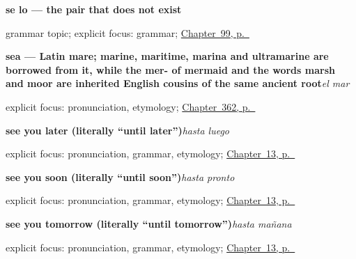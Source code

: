 \noindent\begin{minipage}[t]{\linewidth}
\raggedright
\textbf{se lo — the pair that does not exist}\par
\footnotesize grammar topic; explicit focus: grammar; \hyperref[ch:se-for-le]{Chapter~99, p.~\pageref*{ch:se-for-le}}
\end{minipage}\par\smallskip

\noindent\begin{minipage}[t]{\linewidth}
\raggedright
\textbf{sea — Latin mare; marine, maritime, marina and ultramarine are borrowed from it, while the mer- of mermaid and the words marsh and moor are inherited English cousins of the same ancient root}\enspace\emph{el mar}\par
\footnotesize explicit focus: pronunciation, etymology; \hyperref[ch:la-tierra-y-el-mar]{Chapter~362, p.~\pageref*{ch:la-tierra-y-el-mar}}
\end{minipage}\par\smallskip

\noindent\begin{minipage}[t]{\linewidth}
\raggedright
\textbf{see you later (literally \textquotedblleft{}until later\textquotedblright{})}\enspace\emph{hasta luego}\par
\footnotesize explicit focus: pronunciation, grammar, etymology; \hyperref[ch:until-when]{Chapter~13, p.~\pageref*{ch:until-when}}
\end{minipage}\par\smallskip

\noindent\begin{minipage}[t]{\linewidth}
\raggedright
\textbf{see you soon (literally \textquotedblleft{}until soon\textquotedblright{})}\enspace\emph{hasta pronto}\par
\footnotesize explicit focus: pronunciation, grammar, etymology; \hyperref[ch:until-when]{Chapter~13, p.~\pageref*{ch:until-when}}
\end{minipage}\par\smallskip

\noindent\begin{minipage}[t]{\linewidth}
\raggedright
\textbf{see you tomorrow (literally \textquotedblleft{}until tomorrow\textquotedblright{})}\enspace\emph{hasta mañana}\par
\footnotesize explicit focus: pronunciation, grammar, etymology; \hyperref[ch:until-when]{Chapter~13, p.~\pageref*{ch:until-when}}
\end{minipage}\par\smallskip

